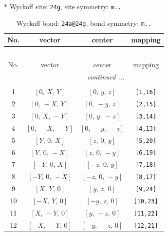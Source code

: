 \documentclass[fleqn,8pt]{jsarticle}
\begin{document}
* Wyckoff site: {\tt 24g}, site symmetry: {\tt m..}
\renewcommand{\arraystretch}{1.2}
\begin{longtable}{cccc}
\caption{Wyckoff bond: {\tt 24a@24g}, bond symmetry: {\tt m..}}
 \\
 \hline \hline
No. & vector & center & mapping \\ \hline \endfirsthead

\multicolumn{3}{l}{\tablename\ \thetable{}} \\
 \hline \hline
No. & vector & center & mapping \\ \hline \endhead

 \hline \hline
\multicolumn{3}{r}{\footnotesize\it continued ...} \\ \endfoot

 \hline \hline
\multicolumn{3}{r}{} \\ \endlastfoot

1 & $\left[ 0,\, X,\, Y \right]$ & $\left[ 0,\, y,\, z \right]$ & {\tt [1,16]} \\ \hline
2 & $\left[ 0,\, - X,\, Y \right]$ & $\left[ 0,\, - y,\, z \right]$ & {\tt [2,15]} \\ \hline
3 & $\left[ 0,\, X,\, - Y \right]$ & $\left[ 0,\, y,\, - z \right]$ & {\tt [3,14]} \\ \hline
4 & $\left[ 0,\, - X,\, - Y \right]$ & $\left[ 0,\, - y,\, - z \right]$ & {\tt [4,13]} \\ \hline
5 & $\left[ Y,\, 0,\, X \right]$ & $\left[ z,\, 0,\, y \right]$ & {\tt [5,20]} \\ \hline
6 & $\left[ Y,\, 0,\, - X \right]$ & $\left[ z,\, 0,\, - y \right]$ & {\tt [6,19]} \\ \hline
7 & $\left[ - Y,\, 0,\, X \right]$ & $\left[ - z,\, 0,\, y \right]$ & {\tt [7,18]} \\ \hline
8 & $\left[ - Y,\, 0,\, - X \right]$ & $\left[ - z,\, 0,\, - y \right]$ & {\tt [8,17]} \\ \hline
9 & $\left[ X,\, Y,\, 0 \right]$ & $\left[ y,\, z,\, 0 \right]$ & {\tt [9,24]} \\ \hline
10 & $\left[ - X,\, Y,\, 0 \right]$ & $\left[ - y,\, z,\, 0 \right]$ & {\tt [10,23]} \\ \hline
11 & $\left[ X,\, - Y,\, 0 \right]$ & $\left[ y,\, - z,\, 0 \right]$ & {\tt [11,22]} \\ \hline
12 & $\left[ - X,\, - Y,\, 0 \right]$ & $\left[ - y,\, - z,\, 0 \right]$ & {\tt [12,21]} \\
\end{longtable}
\renewcommand{\arraystretch}{1.2}
\end{document}
